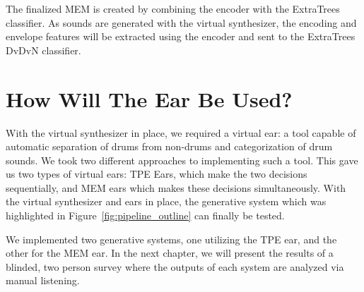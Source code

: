 \documentclass[\main/thesis.tex]{subfiles}
\begin{document}
The finalized MEM is created by combining the encoder with the ExtraTrees classifier. As sounds are generated with the virtual synthesizer, the encoding and envelope features will be extracted using the encoder and sent to the ExtraTrees DvDvN classifier. 


\section{How Will The Ear Be Used?}
With the virtual synthesizer in place, we required a virtual ear: a tool capable of automatic separation of drums from non-drums and categorization of drum sounds. We took two different approaches to implementing such a tool. This gave us two types of virtual ears: TPE Ears, which make the two decisions sequentially, and MEM ears which makes these decisions simultaneously. With the virtual synthesizer and ears in place, the generative system which was highlighted in Figure~\ref{fig:pipeline_outline} can finally be tested.

We implemented two generative systems, one utilizing the TPE ear, and the other for the MEM ear. In the next chapter, we will present the results of a blinded, two person survey where the outputs of each system are analyzed via manual listening. 



\end{document}
